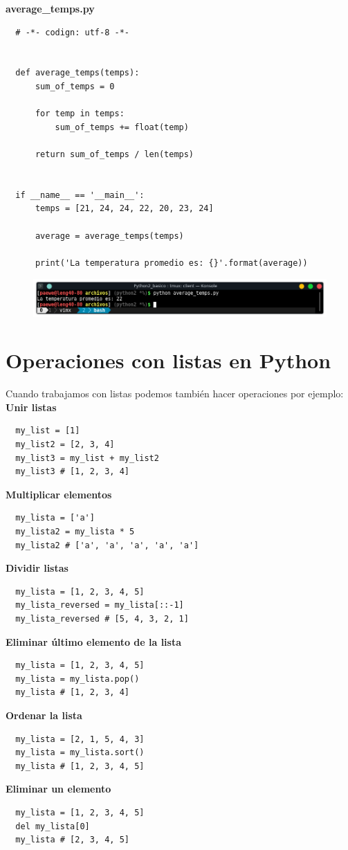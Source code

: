 \documentclass{article}
\begin{document}
\textbf{average\_temps.py}
\begin{verbatim}
  # -*- codign: utf-8 -*-


  def average_temps(temps):
      sum_of_temps = 0

      for temp in temps:
          sum_of_temps += float(temp)

      return sum_of_temps / len(temps)


  if __name__ == '__main__':
      temps = [21, 24, 24, 22, 20, 23, 24]

      average = average_temps(temps)

      print('La temperatura promedio es: {}'.format(average))
\end{verbatim}

\begin{figure}[h!]
  \centering
  \includegraphics[scale=0.75]{./Pictures/034_average_temp.png}
\end{figure}


\section{Operaciones con listas en Python}%
Cuando trabajamos con listas podemos también hacer operaciones por ejemplo:\\

\textbf{Unir listas}
\begin{verbatim}
  my_list = [1]
  my_list2 = [2, 3, 4]
  my_list3 = my_list + my_list2
  my_list3 # [1, 2, 3, 4]
\end{verbatim}


\textbf{Multiplicar elementos}
\begin{verbatim}
  my_lista = ['a']
  my_lista2 = my_lista * 5
  my_lista2 # ['a', 'a', 'a', 'a', 'a']
\end{verbatim}

\textbf{Dividir listas}
\begin{verbatim}
  my_lista = [1, 2, 3, 4, 5]
  my_lista_reversed = my_lista[::-1]
  my_lista_reversed # [5, 4, 3, 2, 1]
\end{verbatim}

\textbf{Eliminar último elemento de la lista}
\begin{verbatim}
  my_lista = [1, 2, 3, 4, 5]
  my_lista = my_lista.pop()
  my_lista # [1, 2, 3, 4]
\end{verbatim}

\textbf{Ordenar la lista}
\begin{verbatim}
  my_lista = [2, 1, 5, 4, 3]
  my_lista = my_lista.sort()
  my_lista # [1, 2, 3, 4, 5]
\end{verbatim}

\textbf{Eliminar un elemento}
\begin{verbatim}
  my_lista = [1, 2, 3, 4, 5]
  del my_lista[0]
  my_lista # [2, 3, 4, 5]
\end{verbatim}
\end{document}
